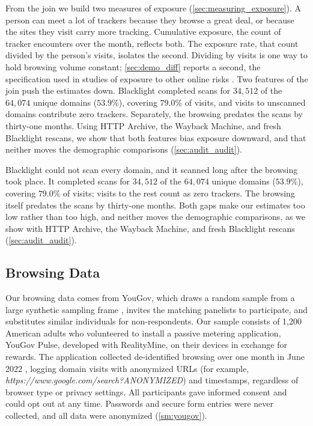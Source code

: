 \documentclass[12pt, letterpaper]{article}
\begin{document}
From the join we build two measures of exposure (\cref{sec:measuring_exposure}). A person can meet a lot of trackers because they browse a great deal, or because the sites they visit carry more tracking. Cumulative exposure, the count of tracker encounters over the month, reflects both.
The exposure rate, that count divided by the person's visits, isolates the second. Dividing by visits is one way to hold browsing volume constant; \cref{sec:demo_diff} reports a second, the specification used in studies of exposure to other online risks \citep{bad_domains}. Two features of the join push the estimates down. Blacklight completed scans for $34{,}512$ of the $64{,}074$ unique domains ($53.9\%$), covering $79.0\%$ of visits, and visits to unscanned domains contribute zero trackers. Separately, the browsing predates the scans by thirty-one months. Using HTTP Archive, the Wayback Machine, and fresh Blacklight rescans, we show that both features bias exposure downward, and that neither moves the demographic comparisons (\cref{sec:audit_audit}).

Blacklight could not scan every domain, and it scanned long after the browsing took place. It completed scans for $34{,}512$ of the $64{,}074$ unique domains ($53.9\%$), covering $79.0\%$ of visits; visits to the rest count as zero trackers. The browsing itself predates the scans by thirty-one months. Both gaps make our estimates too low rather than too high, and neither moves the demographic comparisons, as we show with HTTP Archive, the Wayback Machine, and fresh Blacklight rescans (\cref{sec:audit_audit}).

\subsection{Browsing Data}
\label{sec:browsing_data}
 
Our browsing data comes from YouGov, which draws a random sample from a large synthetic sampling frame \citep{rivers2009}, invites the matching panelists to participate, and substitutes similar individuals for non-respondents. Our sample consists of 1,200 American adults who volunteered to install a passive metering application, YouGov Pulse, developed with RealityMine, on their devices in exchange for rewards. The application collected de-identified browsing over one month in June 2022 \citep{bad_domains, data-dataverse, ss-adult}, logging domain visits with anonymized URLs (for example, \textit{https://www.google.com/search?ANONYMIZED}) and timestamps, regardless of browser type or privacy settings. All participants gave informed consent and could opt out at any time. Passwords and secure form entries were never collected, and all data were anonymized (\cref{sm:yougov}).
 
\end{document}

